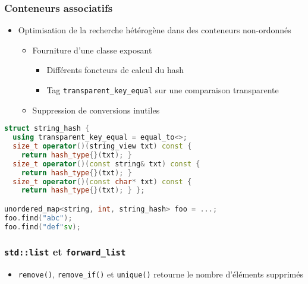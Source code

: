 \documentclass[C++.tex]{subfiles}
\begin{document}
\begin{frame}[fragile]
	\frametitle{Conteneurs associatifs}
	\begin{itemize}
		\item Optimisation de la recherche hétérogène dans des conteneurs non-ordonnés
		\begin{itemize}
			\item Fourniture d'une classe exposant
			\begin{itemize}
				\item Différents foncteurs de calcul du hash
				\item Tag \lstinline|transparent_key_equal| sur une comparaison transparente


			\end{itemize}
			\item Suppression de conversions inutiles
		\end{itemize}
	\end{itemize}

	\begin{lstlisting}[language=C++]
struct string_hash {
  using transparent_key_equal = equal_to<>;
  size_t operator()(string_view txt) const { 
    return hash_type{}(txt); }
  size_t operator()(const string& txt) const {
    return hash_type{}(txt); }
  size_t operator()(const char* txt) const {
    return hash_type{}(txt); } };

unordered_map<string, int, string_hash> foo = ...;
foo.find("abc");
foo.find("def"sv);\end{lstlisting}
\end{frame}

\begin{frame}[fragile]
	\frametitle{\lstinline|std::list| et \lstinline|forward_list|}
	\begin{itemize}
		\item \lstinline|remove()|, \lstinline|remove_if()| et \lstinline|unique()| retourne le nombre d'éléments supprimés
	\end{itemize}
\end{frame}
\end{document}
